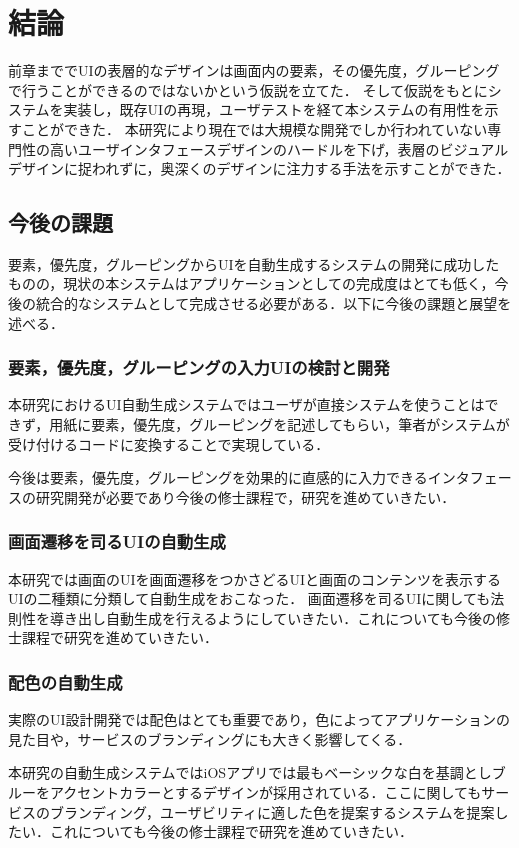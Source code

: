 \chapter{結論}
\label{chap:conclusion}
前章まででUIの表層的なデザインは画面内の要素，その優先度，グルーピングで行うことができるのではないかという仮説を立てた．
そして仮説をもとにシステムを実装し，既存UIの再現，ユーザテストを経て本システムの有用性を示すことができた．
本研究により現在では大規模な開発でしか行われていない専門性の高いユーザインタフェースデザインのハードルを下げ，表層のビジュアルデザインに捉われずに，奥深くのデザインに注力する手法を示すことができた．


\section{今後の課題}

要素，優先度，グルーピングからUIを自動生成するシステムの開発に成功したものの，現状の本システムはアプリケーションとしての完成度はとても低く，今後の統合的なシステムとして完成させる必要がある．以下に今後の課題と展望を述べる．
\subsection{要素，優先度，グルーピングの入力UIの検討と開発}
本研究におけるUI自動生成システムではユーザが直接システムを使うことはできず，用紙に要素，優先度，グルーピングを記述してもらい，筆者がシステムが受け付けるコードに変換することで実現している．

今後は要素，優先度，グルーピングを効果的に直感的に入力できるインタフェースの研究開発が必要であり今後の修士課程で，研究を進めていきたい．
\subsection{画面遷移を司るUIの自動生成}
本研究では画面のUIを画面遷移をつかさどるUIと画面のコンテンツを表示するUIの二種類に分類して自動生成をおこなった．
画面遷移を司るUIに関しても法則性を導き出し自動生成を行えるようにしていきたい．これについても今後の修士課程で研究を進めていきたい．
\subsection{配色の自動生成}
実際のUI設計開発では配色はとても重要であり，色によってアプリケーションの見た目や，サービスのブランディングにも大きく影響してくる．

本研究の自動生成システムではiOSアプリでは最もベーシックな白を基調としブルーをアクセントカラーとするデザインが採用されている．ここに関してもサービスのブランディング，ユーザビリティに適した色を提案するシステムを提案したい．これについても今後の修士課程で研究を進めていきたい．

